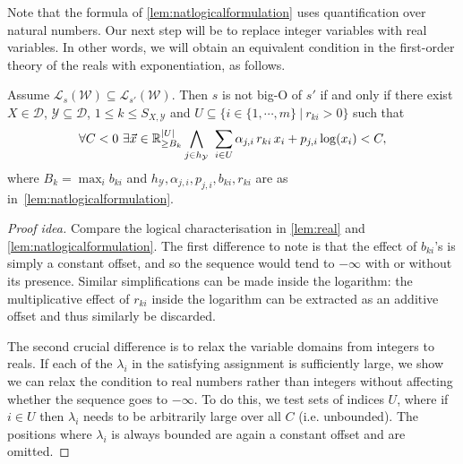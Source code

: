 \documentclass[10pt,a4paper]{amsart}
\numberwithin{equation}{section}
\theoremstyle{plain}
\theoremstyle{definition}
\theoremstyle{remark}
\newcommand\lng[2]{\mathcal{L}_{#1}(#2)}
\newcommand\revar{x}
\newcommand\revec{\vec{x}}
\newcommand\basevecraw{b}
\newcommand\pvecraw{r}
\newcommand\adm{\mathcal{D}}
\newcommand\wa{\mathcal{W}}
\begin{document}
Note that the formula of \cref{lem:natlogicalformulation} uses quantification over natural numbers. Our next step will be to replace integer variables with real variables. In other words, we will obtain an equivalent condition in the first-order theory of the reals with exponentiation, as follows.
\begin{lem}\label{lem:real}
Assume  $\lng{s}{\wa}\subseteq \lng{s'}{\wa}$. Then
$s$ is not big-O of $s'$ if and only if there exist $X\in\adm$, $\mathcal{Y}\subseteq\adm$, $1\le k\le S_{X,\mathcal{Y}}$ and $U\subseteq  \{i \in \{1,\cdots,m\} \ | \ \pvecraw_{ki} > 0 \}$ such that
\[
\forall C < 0 \  \exists \revec \in \mathbb{R}^{|U|}_{\ge B_k}\\
\bigwedge_{j\in h_\mathcal{Y}}\   \sum_{i \in U} \alpha_{j,i}\, \pvecraw_{ki}\, \revar_i + p_{j,i}\log(\revar_i) < C,
\]
where $B_k=\max_i{\basevecraw_{ki}}$ and $h_\mathcal{Y}, \alpha_{j,i}, p_{j,i}, \basevecraw_{ki},  \pvecraw_{ki}$ are as in~\cref{lem:natlogicalformulation}.
\end{lem}
\begin{proof}[Proof idea]
Compare the logical characterisation in \cref{lem:real} and \cref{lem:natlogicalformulation}. The first difference to note is that the effect of $\basevecraw_{ki}$'s is simply a constant offset, and so the sequence would tend to $-\infty$ with or without its presence. Similar simplifications can be made inside the logarithm: the multiplicative effect of $\pvecraw_{ki}$ inside the logarithm can be extracted as an additive offset and thus similarly be discarded.

The second crucial difference is to relax the variable domains from integers to  reals. If each of the $\lambda_i$ in the satisfying assignment is sufficiently large, we show we  can relax the condition to real numbers rather than integers without affecting whether the sequence goes to $-\infty$. To do this, we test sets of indices $U$, where if $i\in U$ then $\lambda_i$ needs to be arbitrarily large over all $C$ (i.e. unbounded). The positions where $\lambda_i$ is always bounded are again a constant offset and are omitted.
\end{proof}
\end{document}
